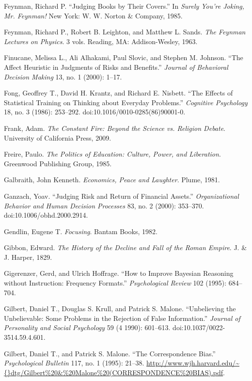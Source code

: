 \documentclass[letterpaper]{book}
\begin{document}
{
 Feynman, Richard P. ``Judging Books by Their
Covers.'' In \textit{Surely You're
Joking, Mr. Feynman!} New York: W. W. Norton \& Company, 1985.}

{
 Feynman, Richard P., Robert B. Leighton, and Matthew L. Sands.
\textit{The Feynman Lectures on Physics}. 3 vols. Reading, MA:
Addison-Wesley, 1963.}

{
 Finucane, Melissa L., Ali Alhakami, Paul Slovic, and Stephen M.
Johnson. ``The Affect Heuristic in Judgments of Risks
and Benefits.'' \textit{Journal of Behavioral
Decision Making} 13, no. 1 (2000): 1--17.}

{
 Fong, Geoffrey T., David H. Krantz, and Richard E. Nisbett.
``The Effects of Statistical Training on Thinking
about Everyday Problems.'' \textit{Cognitive
Psychology} 18, no. 3 (1986): 253--292.
doi:10.1016/0010-0285(86)90001-0.}

{
 Frank, Adam. \textit{The Constant Fire: Beyond the Science vs.
Religion Debate}. University of California Press, 2009.}

{
 Freire, Paulo. \textit{The Politics of Education: Culture, Power,
and Liberation}. Greenwood Publishing Group, 1985.}

{
 Galbraith, John Kenneth. \textit{Economics, Peace and Laughter}.
Plume, 1981.}

{
 Ganzach, Yoav. ``Judging Risk and Return of
Financial Assets.'' \textit{Organizational Behavior
and Human Decision Processes} 83, no. 2 (2000): 353--370.
doi:10.1006/obhd.2000.2914.}

{
 Gendlin, Eugene T. \textit{Focusing}. Bantam Books, 1982.}

{
 Gibbon, Edward. \textit{The History of the Decline and Fall of the
Roman Empire}. J. \& J. Harper, 1829.}

{
 Gigerenzer, Gerd, and Ulrich Hoffrage. ``How to
Improve Bayesian Reasoning without Instruction: Frequency
Formats.'' \textit{Psychological Review} 102 (1995):
684--704.}

{
 Gilbert, Daniel T., Douglas S. Krull, and Patrick S. Malone.
``Unbelieving the Unbelievable: Some Problems in the
Rejection of False Information.'' \textit{Journal of
Personality and Social Psychology} 59 (4 1990): 601--613.
doi:10.1037/0022-3514.59.4.601.}

{
 Gilbert, Daniel T., and Patrick S. Malone. ``The
Correspondence Bias.'' \textit{Psychological
Bulletin} 117, no. 1 (1995): 21--38.
\url{http://www.wjh.harvard.edu/\~{}dtg/Gilbert\%20\&\%20Malone\%20(CORRESPONDENCE\%20BIAS).pdf}.}
\end{document}

